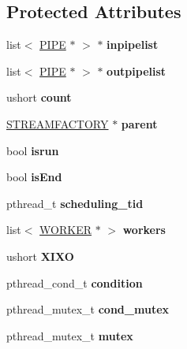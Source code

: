 \subsection*{Protected Attributes}
\begin{DoxyCompactItemize}
\item 
\hypertarget{classCELL_a12af7a46f05c67ea5ad29d436e260897}{}list$<$ \hyperlink{classPIPE}{P\+I\+P\+E} $\ast$ $>$ $\ast$ {\bfseries inpipelist}\label{classCELL_a12af7a46f05c67ea5ad29d436e260897}

\item 
\hypertarget{classCELL_ad352add44722ccba56347f90134294bf}{}list$<$ \hyperlink{classPIPE}{P\+I\+P\+E} $\ast$ $>$ $\ast$ {\bfseries outpipelist}\label{classCELL_ad352add44722ccba56347f90134294bf}

\item 
\hypertarget{classCELL_a9daad014764db889e1eb1ae8e9a3e669}{}ushort {\bfseries count}\label{classCELL_a9daad014764db889e1eb1ae8e9a3e669}

\item 
\hypertarget{classCELL_a2134083623b7adc33f790f1bebd49193}{}\hyperlink{classSTREAMFACTORY}{S\+T\+R\+E\+A\+M\+F\+A\+C\+T\+O\+R\+Y} $\ast$ {\bfseries parent}\label{classCELL_a2134083623b7adc33f790f1bebd49193}

\item 
\hypertarget{classCELL_a5b8c354b0b11bf129bb201867e6ed1f9}{}bool {\bfseries isrun}\label{classCELL_a5b8c354b0b11bf129bb201867e6ed1f9}

\item 
\hypertarget{classCELL_a48ac64047c6cbb13258ed723df05329d}{}bool {\bfseries is\+End}\label{classCELL_a48ac64047c6cbb13258ed723df05329d}

\item 
\hypertarget{classCELL_af34bb74ac1ad036c344ba8924576e6a7}{}pthread\+\_\+t {\bfseries scheduling\+\_\+tid}\label{classCELL_af34bb74ac1ad036c344ba8924576e6a7}

\item 
\hypertarget{classCELL_abf039900f9bb3735e2d0f97d399780cd}{}list$<$ \hyperlink{classWORKER}{W\+O\+R\+K\+E\+R} $\ast$ $>$ {\bfseries workers}\label{classCELL_abf039900f9bb3735e2d0f97d399780cd}

\item 
\hypertarget{classCELL_a089446e6f9d6281652344c0f3fce062b}{}ushort {\bfseries X\+I\+X\+O}\label{classCELL_a089446e6f9d6281652344c0f3fce062b}

\item 
\hypertarget{classCELL_a97db6750f7be9deeba90eb1bf03f7bf7}{}pthread\+\_\+cond\+\_\+t {\bfseries condition}\label{classCELL_a97db6750f7be9deeba90eb1bf03f7bf7}

\item 
\hypertarget{classCELL_a85ebe512fcc57a9e7dba4318e1999cc9}{}pthread\+\_\+mutex\+\_\+t {\bfseries cond\+\_\+mutex}\label{classCELL_a85ebe512fcc57a9e7dba4318e1999cc9}

\item 
\hypertarget{classCELL_a6eb8c2b8eaff0eff3f4bf585132d73b0}{}pthread\+\_\+mutex\+\_\+t {\bfseries mutex}\label{classCELL_a6eb8c2b8eaff0eff3f4bf585132d73b0}

\end{DoxyCompactItemize}


